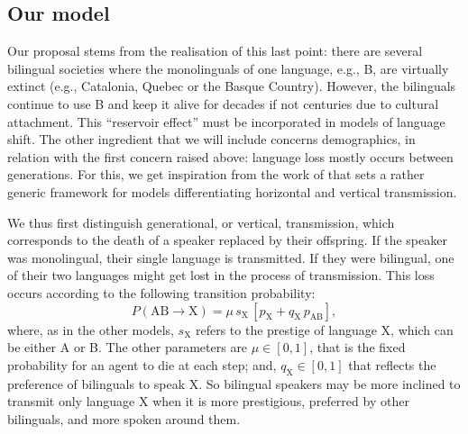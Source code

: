 \documentclass[../thesis.tex]{subfiles}
\begin{document}
\subsection{Our model}
Our proposal stems from the realisation of this last point: there are several bilingual
societies where the monolinguals of one language, e.g., B, are virtually extinct (e.g.,
Catalonia, Quebec or the Basque Country). However, the bilinguals continue to use B and
keep it alive for decades if not centuries due to cultural attachment. This ``reservoir
effect'' must be incorporated in models of language shift. The other ingredient that we
will include concerns demographics, in relation with the first concern raised above:
language loss mostly occurs between generations. For this, we get inspiration from the
work of \cite{MinettModellingEndangered2008} that sets a rather generic framework for
models differentiating horizontal and vertical transmission.

We thus first distinguish generational, or vertical, transmission, which corresponds to
the death of a speaker replaced by their offspring. If the speaker was monolingual,
their single language is transmitted. If they were bilingual, one of their two languages
might get lost in the process of transmission. This loss occurs according to the
following transition probability:
\begin{equation}
    P (\text{AB} \rightarrow \text{X}) = \mu \, s_\text{X} \, \left[ p_{\text{X}} + q_\text{X} \, p_{\text{AB}} \right],
\end{equation}
where, as in the other models, $s_\text{X}$ refers to the prestige of language X, which
can be either A or B. The other parameters are $\mu \in [0, 1]$, that is the fixed
probability for an agent to die at each step; and, $q_\text{X} \in [0, 1]$ that reflects
the preference of bilinguals to speak X. So bilingual speakers may be more inclined to
transmit only language X when it is more prestigious, preferred by other bilinguals, and
more spoken around them.
\end{document}
